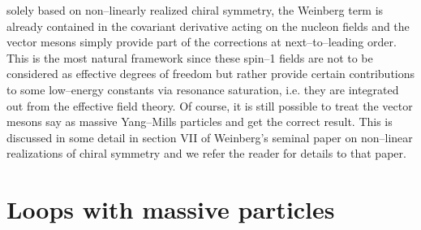 solely based on non--linearly realized chiral symmetry, the Weinberg
term is already contained in the covariant derivative acting on the
nucleon fields and the vector mesons simply provide part of the
corrections at next--to--leading order. This is the most natural
framework since these spin--1 fields are not to be considered as
effective degrees of freedom but rather provide certain contributions
to some low--energy constants via resonance saturation, i.e. they are
integrated out from the effective field theory.  Of course, it
is still possible to treat the vector mesons say as massive
Yang--Mills particles and get the correct result. This is discussed in
some detail in section VII of Weinberg's seminal paper \cite{weinnon}
on non--linear realizations of chiral symmetry and we refer the reader
for details to that paper.


\section{Loops with massive particles}

